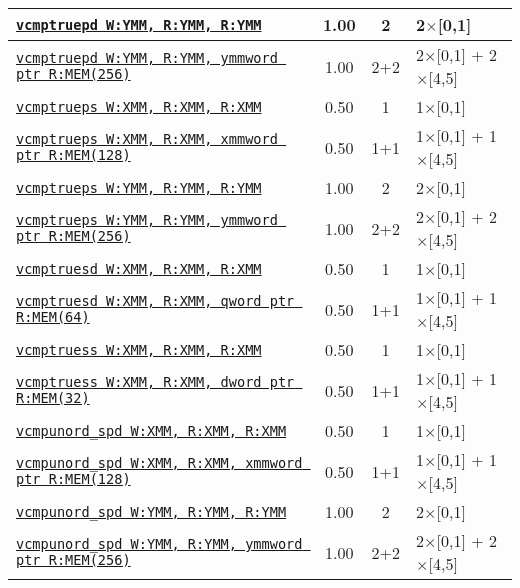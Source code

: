 \documentclass[a4paper,english,fontsize=9]{scrartcl}
\begin{document}
\begin{longtable}{p{}ccL{.25\textwidth}}
  \midrule
  \texttt{\href{https://felixcloutier.com/x86/CMPPD.html}{vcmptruepd W:YMM, R:YMM, R:YMM}} & 1.00 & 2 & 2\(\times\)[0,1] \\
  \midrule
  \texttt{\href{https://felixcloutier.com/x86/CMPPD.html}{vcmptruepd W:YMM, R:YMM, ymmword ptr R:MEM(256)}} & 1.00 & 2+2 & 2\(\times\)[0,1] + 2\(\times\)[4,5] \\
  \midrule
  \texttt{\href{https://felixcloutier.com/x86/CMPPS.html}{vcmptrueps W:XMM, R:XMM, R:XMM}} & 0.50 & 1 & 1\(\times\)[0,1] \\
  \midrule
  \texttt{\href{https://felixcloutier.com/x86/CMPPS.html}{vcmptrueps W:XMM, R:XMM, xmmword ptr R:MEM(128)}} & 0.50 & 1+1 & 1\(\times\)[0,1] + 1\(\times\)[4,5] \\
  \midrule
  \texttt{\href{https://felixcloutier.com/x86/CMPPS.html}{vcmptrueps W:YMM, R:YMM, R:YMM}} & 1.00 & 2 & 2\(\times\)[0,1] \\
  \midrule
  \texttt{\href{https://felixcloutier.com/x86/CMPPS.html}{vcmptrueps W:YMM, R:YMM, ymmword ptr R:MEM(256)}} & 1.00 & 2+2 & 2\(\times\)[0,1] + 2\(\times\)[4,5] \\
  \midrule
  \texttt{\href{https://felixcloutier.com/x86/CMPSD.html}{vcmptruesd W:XMM, R:XMM, R:XMM}} & 0.50 & 1 & 1\(\times\)[0,1] \\
  \midrule
  \texttt{\href{https://felixcloutier.com/x86/CMPSD.html}{vcmptruesd W:XMM, R:XMM, qword ptr R:MEM(64)}} & 0.50 & 1+1 & 1\(\times\)[0,1] + 1\(\times\)[4,5] \\
  \midrule
  \texttt{\href{https://felixcloutier.com/x86/CMPSS.html}{vcmptruess W:XMM, R:XMM, R:XMM}} & 0.50 & 1 & 1\(\times\)[0,1] \\
  \midrule
  \texttt{\href{https://felixcloutier.com/x86/CMPSS.html}{vcmptruess W:XMM, R:XMM, dword ptr R:MEM(32)}} & 0.50 & 1+1 & 1\(\times\)[0,1] + 1\(\times\)[4,5] \\
  \midrule
  \texttt{\href{https://felixcloutier.com/x86/CMPPD.html}{vcmpunord\_spd W:XMM, R:XMM, R:XMM}} & 0.50 & 1 & 1\(\times\)[0,1] \\
  \midrule
  \texttt{\href{https://felixcloutier.com/x86/CMPPD.html}{vcmpunord\_spd W:XMM, R:XMM, xmmword ptr R:MEM(128)}} & 0.50 & 1+1 & 1\(\times\)[0,1] + 1\(\times\)[4,5] \\
  \midrule
  \texttt{\href{https://felixcloutier.com/x86/CMPPD.html}{vcmpunord\_spd W:YMM, R:YMM, R:YMM}} & 1.00 & 2 & 2\(\times\)[0,1] \\
  \midrule
  \texttt{\href{https://felixcloutier.com/x86/CMPPD.html}{vcmpunord\_spd W:YMM, R:YMM, ymmword ptr R:MEM(256)}} & 1.00 & 2+2 & 2\(\times\)[0,1] + 2\(\times\)[4,5] \\

\end{longtable}
\end{document}

